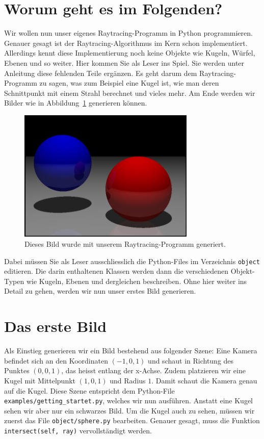 \documentclass[12pt,a4paper]{article}
\begin{document}
	\section*{Worum geht es im Folgenden?}
	Wir wollen nun unser eigenes Raytracing-Programm in Python programmieren.
	Genauer gesagt ist der Raytracing-Algorithmus im Kern schon implementiert.
	Allerdings kennt diese Implementierung noch keine Objekte wie Kugeln, Würfel, Ebenen und so weiter.
	Hier kommen Sie als Leser ins Spiel.
	Sie werden unter Anleitung diese fehlenden Teile ergänzen.
	Es geht darum dem Raytracing-Programm zu sagen, was zum Beispiel eine Kugel ist, wie man deren Schnittpunkt mit einem Strahl berechnet und vieles mehr.
	Am Ende werden wir Bilder wie in Abbildung~\ref{fig:goal} generieren können.
	\begin{figure}[h!]
		\centering
		\includegraphics[width=0.75\textwidth]{images/image.png}
		\caption{Dieses Bild wurde mit unserem Raytracing-Programm generiert.}
		\label{fig:goal}
	\end{figure}
	Dabei müssen Sie als Leser ausschliesslich die Python-Files im Verzeichnis \texttt{object} editieren.
	Die darin enthaltenen Klassen werden dann die verschiedenen Objekt-Typen wie Kugeln, Ebenen und dergleichen beschreiben.
	Ohne hier weiter ins Detail zu gehen, werden wir nun unser erstes Bild generieren.

	\section*{Das erste Bild}
	Als Einstieg generieren wir ein Bild bestehend aus folgender Szene:
	Eine Kamera befindet sich an den Koordinaten $(-1,0,1)$ und schaut in Richtung des Punktes $(0,0,1)$, das heisst entlang der x-Achse.
	Zudem platzieren wir eine Kugel mit Mittelpunkt $(1,0,1)$ und Radius $1$.
	Damit schaut die Kamera genau auf die Kugel.
	Diese Szene entspricht dem Python-File \texttt{examples/getting\_startet.py}, welches wir nun ausführen. Anstatt eine Kugel sehen wir aber nur ein schwarzes Bild.
	Um die Kugel auch zu sehen, müssen wir zuerst das File \texttt{object/sphere.py} bearbeiten.
	Genauer gesagt, muss die Funktion \texttt{intersect(self, ray)} vervollständigt werden.
\end{document}
